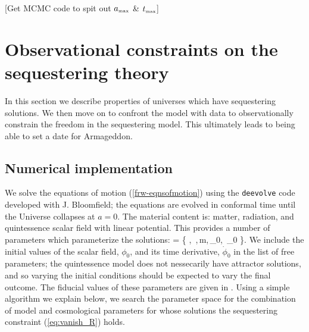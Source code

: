\documentclass[amsmath,amssymb,10pt,twocolumn,eqsecnum]{revtex4}
\newcommand{\comment}[1]{{\color{red}[#1]}}
\begin{document}
\comment{Get MCMC code to spit out ${a}_{\scriptscriptstyle{\textrm{max}}}$ \& ${t}_{\scriptscriptstyle{\textrm{max}}}$}

\section{Observational constraints on the sequestering theory} 
In this section we describe properties of universes which have sequestering solutions. We then move on to confront the model with   data to observationally constrain the freedom in the sequestering model. This ultimately leads to being able to set a date for Armageddon.

\subsection{Numerical implementation}

We solve the equations of motion (\ref{frw-eqnsofmotion}) using the  {\tt deevolve} code developed with J. Bloomfield; the equations are evolved in conformal time until the Universe collapses at $a=0$.  The material content is: matter, radiation, and quintessence scalar field with linear potential. This provides a number of parameters which  parameterize the solutions: 
\bea
{} = \left\{ , \,,\,m,\,\phi_0, \,\dot{\phi}_0 \right\}.
\eea
We include the initial values of the scalar field, $\phi_0$, and its time derivative, $\dot{\phi}_0$ in the list of free parameters; the quintessence model does not nessecarily have attractor solutions, and so varying the initial conditions should be expected to vary the final outcome. The fiducial values of these parameters are given in . Using a simple algorithm we explain below, we search the parameter space for the combination of model and cosmological parameters for whose solutions the sequestering constraint (\ref{eq:vanish_R}) holds. 
\end{document}
